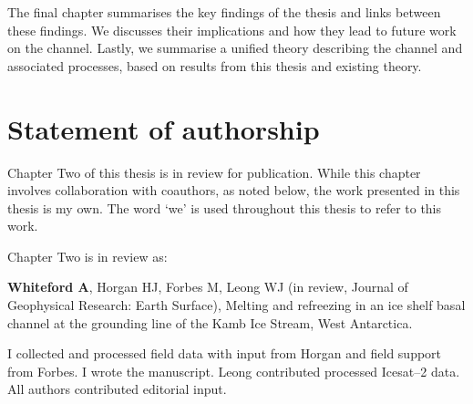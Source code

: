 The final chapter summarises the key findings of the thesis and links between these findings. We discusses their implications and how they lead to future work on the channel. Lastly, we  summarise a unified theory describing the channel and associated processes, based on results from this thesis and existing theory.

\section{Statement of authorship}
Chapter Two of this thesis is in review for publication. While this chapter involves collaboration with coauthors, as noted below, the work presented in this thesis is my own. The word `we' is used throughout this thesis to refer to this work. 

Chapter Two is in review as:

\textbf{Whiteford A}, Horgan HJ, Forbes M, Leong WJ (in review, Journal of Geophysical Research: Earth Surface), Melting and refreezing in an ice shelf basal channel at the grounding line of the Kamb Ice Stream, West Antarctica. 

I collected and processed field data with input from Horgan and field support from Forbes. I wrote the manuscript. Leong contributed processed Icesat--2 data. All authors contributed editorial input. 


